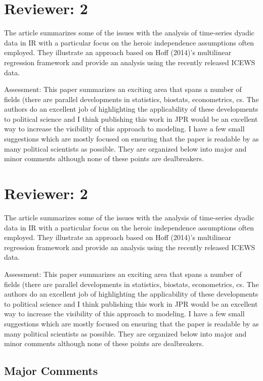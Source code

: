 \section{Reviewer: 2}

The article summarizes some of the issues with the analysis of time-series dyadic data in IR with a particular focus on the heroic independence assumptions often employed. They illustrate an approach based on Hoff (2014)'s multilinear regression framework and provide an analysis using the recently released ICEWS data.

Assessment: This paper summarizes an exciting area that spans a number of fields (there are parallel developments in statistics, biostats, econometrics, cs. The authors do an excellent job of highlighting the applicability of these developments to political science and I think publishing this work in JPR would be an excellent way to increase the visibility of this approach to modeling. I have a few small suggestions which are mostly focused on ensuring that the paper is readable by as many political scientists as possible. They are organized below into major and minor comments although none of these points are dealbreakers.

\section{Reviewer: 2}

The article summarizes some of the issues with the analysis of time-series dyadic data in IR with a particular focus on the heroic independence assumptions often employed. They illustrate an approach based on Hoff (2014)'s multilinear regression framework and provide an analysis using the recently released ICEWS data.

Assessment: This paper summarizes an exciting area that spans a number of fields (there are parallel developments in statistics, biostats, econometrics, cs. The authors do an excellent job of highlighting the applicability of these developments to political science and I think publishing this work in JPR would be an excellent way to increase the visibility of this approach to modeling. I have a few small suggestions which are mostly focused on ensuring that the paper is readable by as many political scientists as possible. They are organized below into major and minor comments although none of these points are dealbreakers.

\subsection{Major Comments}

